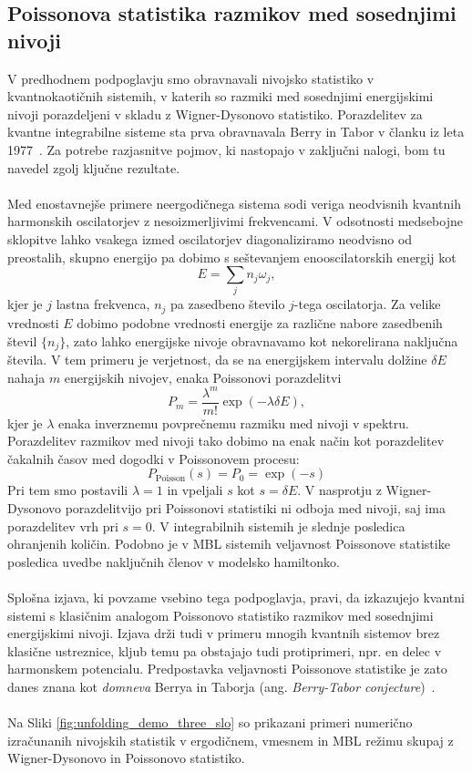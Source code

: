 { \subsection{Poissonova statistika razmikov med sosednjimi nivoji}
 V predhodnem podpoglavju smo obravnavali nivojsko statistiko v kvantnokaotičnih sistemih, v katerih so razmiki med sosednjimi energijskimi nivoji porazdeljeni v skladu z Wigner-Dysonovo statistiko. Porazdelitev za kvantne integrabilne sisteme sta prva obravnavala Berry in Tabor v članku iz leta 1977~\cite{berry1977level}. Za potrebe razjasnitve pojmov, ki nastopajo v zaključni nalogi, bom tu navedel zgolj ključne rezultate. \\\\
 Med enostavnejše primere neergodičnega sistema sodi veriga neodvisnih kvantnih harmonskih oscilatorjev z nesoizmerljivimi frekvencami. V odsotnosti medsebojne sklopitve lahko vsakega izmed oscilatorjev diagonaliziramo neodvisno od preostalih, skupno energijo pa dobimo s seštevanjem enooscilatorskih energij kot 
 $$
 E=\sum_j n_j\omega_j,
 $$ 
 kjer je $j$ lastna frekvenca, $n_j$ pa zasedbeno število $j$-tega oscilatorja. Za velike vrednosti $E$ dobimo podobne vrednosti energije za različne nabore zasedbenih števil $\{n_j\}$, zato lahko energijske nivoje obravnavamo kot nekorelirana naključna števila. V tem primeru je verjetnost, da se na energijskem intervalu dolžine $\delta E$ nahaja $m$ energijskih nivojev, enaka Poissonovi porazdelitvi 
 \begin{equation}
 P_m=\frac{\lambda^m}{m!}\exp\left(-\lambda \delta E\right),
 \end{equation}
 kjer je $\lambda$ enaka inverznemu povprečnemu razmiku med nivoji v spektru. Porazdelitev razmikov med nivoji tako dobimo na enak način kot porazdelitev čakalnih časov med dogodki v Poissonovem procesu:
 \begin{equation}\label{eq:poisson}
 P_\mathrm{Poisson}(s)=P_0=\exp\left(-s\right)
 \end{equation}
 Pri tem smo postavili $\lambda=1$ in vpeljali $s$ kot  $s=\delta E$. V nasprotju z Wigner-Dysonovo porazdelitvijo pri Poissonovi statistiki ni odboja med nivoji, saj ima porazdelitev vrh pri $s=0$. V integrabilnih sistemih je slednje posledica ohranjenih količin. Podobno je v MBL sistemih veljavnost Poissonove statistike posledica uvedbe naključnih členov v modelsko hamiltonko. \\\\
 Splošna izjava, ki povzame vsebino tega podpoglavja, pravi, da izkazujejo kvantni sistemi s klasičnim analogom Poissonovo statistiko razmikov med sosednjimi energijskimi nivoji. Izjava drži tudi v primeru mnogih kvantnih sistemov brez klasične ustreznice, kljub temu pa obstajajo tudi protiprimeri, npr. en delec v harmonskem potencialu. Predpostavka veljavnosti Poissonove statistike je zato danes znana kot \emph{domneva} Berrya in Taborja (ang. \emph{Berry-Tabor conjecture})~\cite{berry1977level}.\\\\
 Na Sliki \ref{fig:unfolding_demo_three_slo} so prikazani primeri numerično izračunanih nivojskih statistik v ergodičnem, vmesnem in MBL režimu skupaj z Wigner-Dysonovo in Poissonovo statistiko. 
}

